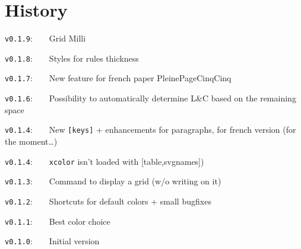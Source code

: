 \documentclass[a4paper]{article}
\begin{document}
\pagebreak

\part*{History}

\verb|v0.1.9|:~~~~Grid \textsf{Milli}

\verb|v0.1.8|:~~~~Styles for rules thickness

\verb|v0.1.7|:~~~~New feature for french paper \textsf{PleinePageCinqCinq}

\verb|v0.1.6|:~~~~Possibility to automatically determine L\&C based on the remaining space

\verb|v0.1.4|:~~~~New \texttt{[keys]} + enhancements for paragraphs, for french version (for the moment\dots)

\verb|v0.1.4|:~~~~\texttt{xcolor} isn't loaded with \textsf{[table,svgnames]})

\verb|v0.1.3|:~~~~Command to display a grid (w/o writing on it)

\verb|v0.1.2|:~~~~Shortcuts for default colors + small bugfixes

\verb|v0.1.1|:~~~~Best color choice

\verb|v0.1.0|:~~~~Initial version
\end{document}
